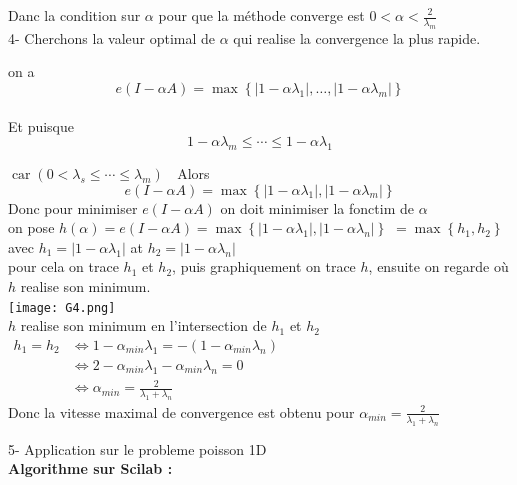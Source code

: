 \documentclass[12pt]{report}
\begin{document}
Danc la condition sur $\alpha $ pour que la méthode converge est $0<\alpha<\frac{2}{\lambda_{m}}$\\

4- Cherchons la valeur optimal de $\alpha$ qui realise la convergence la plus rapide.

on a 
$$e(I-\alpha A)=\max \left\{\left|1-\alpha \lambda_{1}\right|, \ldots,\left|1-\alpha \lambda_{m}\right|\right\}$$\\
Et puisque 
$$1-\alpha \lambda_{m} \leqslant \cdots \leqslant 1-\alpha \lambda_{1}$$

$\operatorname{car}\left(0<\lambda_{s} \leqslant \cdots \leqslant \lambda_{m}\right)$ $\;$
Alors 
$$e(I-\alpha A)=\max \left\{\left|1-\alpha \lambda_{1}\right|,\left|1-\alpha \lambda_{m}\right|\right\}$$
Donc pour minimiser $e(I-\alpha A)$ on doit minimiser la fonctim de $\alpha$\\

on pose $h(\alpha)=e(I-\alpha A)=\max \left\{\left|1-\alpha \lambda_{1}\right|,\left|1-\alpha \lambda_{n}\right|\right\}$
$=\max \left\{h_{1}, h_{2}\right\}$\\
avec $h_{1}=\left|1-\alpha \lambda_{1}\right|$ at $h_{2}=\left|1-\alpha \lambda_{n}\right|$\\

pour cela on trace $h_{1}$ et $h_{2}$, puis graphiquement on trace $h$, ensuite on regarde où $h$ realise son minimum.\\

\texttt{[image: G4.png]}~\\

$h$ realise son minimum en l'intersection de $h_{1}$ et $h_{2}$\\

$\begin{aligned} h_{1}=h_{2} & \Leftrightarrow 1-\alpha_{min} \lambda_{1}=-\left(1-\alpha_{min} \lambda_{n}\right) \\ & \Leftrightarrow 2-\alpha_{min} \lambda_{1}-\alpha_{min} \lambda_{n}=0 \\ & \Leftrightarrow \alpha_{min}=\frac{2}{\lambda_{1}+\lambda_{n}} \end{aligned}$\\

Donc la vitesse maximal de convergence est obtenu pour $\alpha_{min}=\frac{2}{\lambda_{1}+\lambda_{n}} $

5- Application sur le probleme poisson 1D\\

\textbf{Algorithme sur Scilab :}
\end{document}
